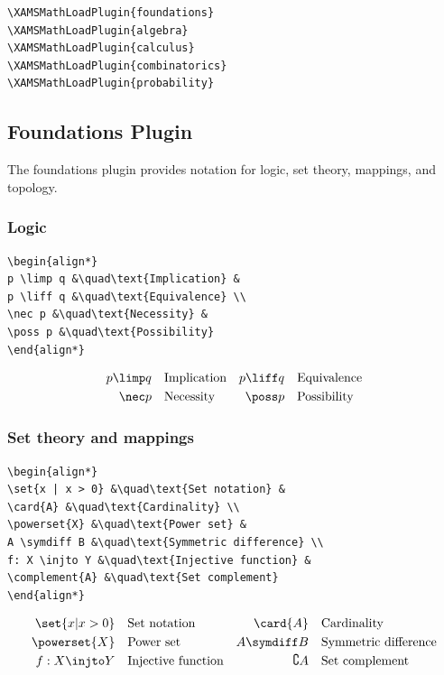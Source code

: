 \documentclass{article}
\begin{document}
\begin{verbatim}
\XAMSMathLoadPlugin{foundations}
\XAMSMathLoadPlugin{algebra}
\XAMSMathLoadPlugin{calculus}
\XAMSMathLoadPlugin{combinatorics}
\XAMSMathLoadPlugin{probability}
\end{verbatim}

\subsection{Foundations Plugin}

The foundations plugin provides notation for logic, set theory, mappings, and topology.

\subsubsection*{Logic}
\begin{verbatim}
\begin{align*}
p \limp q &\quad\text{Implication} &
p \liff q &\quad\text{Equivalence} \\
\nec p &\quad\text{Necessity} &
\poss p &\quad\text{Possibility}
\end{align*}
\end{verbatim}
\begin{align*}
p \limp q &\quad\text{Implication} &
p \liff q &\quad\text{Equivalence} \\
\nec p &\quad\text{Necessity} &
\poss p &\quad\text{Possibility}
\end{align*}

\subsubsection*{Set theory and mappings}
\begin{verbatim}
\begin{align*}
\set{x | x > 0} &\quad\text{Set notation} &
\card{A} &\quad\text{Cardinality} \\
\powerset{X} &\quad\text{Power set} &
A \symdiff B &\quad\text{Symmetric difference} \\
f: X \injto Y &\quad\text{Injective function} &
\complement{A} &\quad\text{Set complement}
\end{align*}
\end{verbatim}
\begin{align*}
\set{x | x > 0} &\quad\text{Set notation} &
\card{A} &\quad\text{Cardinality} \\
\powerset{X} &\quad\text{Power set} &
A \symdiff B &\quad\text{Symmetric difference} \\
f: X \injto Y &\quad\text{Injective function} &
\complement{A} &\quad\text{Set complement}
\end{align*}
\end{document}
